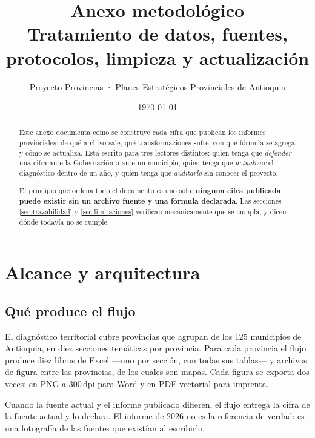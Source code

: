 \documentclass[11pt,a4paper]{article}
\title{\vspace{-1.5cm}\bfseries\color{tintauno}
  Anexo metodológico\\[2mm]
  \large\mdseries\color{tintados}
  Tratamiento de datos, fuentes, protocolos, limpieza y actualización}
\author{\normalsize\color{tintados} Proyecto Provincias · Planes Estratégicos
  Provinciales de Antioquia}
\date{\normalsize\color{tintatres}\today}
\begin{document}
\maketitle
\thispagestyle{fancy}

\begin{abstract}
\noindent
Este anexo documenta cómo se construye cada cifra que publican los informes
provinciales: de qué archivo sale, qué transformaciones sufre, con qué fórmula
se agrega y cómo se actualiza. Está escrito para tres lectores distintos: quien
tenga que \emph{defender} una cifra ante la Gobernación o ante un municipio,
quien tenga que \emph{actualizar} el diagnóstico dentro de un año, y quien tenga
que \emph{auditarlo} sin conocer el proyecto.

El principio que ordena todo el documento es uno solo: \textbf{ninguna cifra
publicada puede existir sin un archivo fuente y una fórmula declarada}. Las
secciones \ref{sec:trazabilidad} y \ref{sec:limitaciones} verifican
mecánicamente que se cumpla, y dicen dónde todavía no se cumple.
\end{abstract}

\tableofcontents
\newpage

\section{Alcance y arquitectura}

\subsection{Qué produce el flujo}

El diagnóstico territorial cubre \cifraProvincias{} provincias que agrupan
\cifraMunicipios{} de los 125 municipios de Antioquia, en diez secciones
temáticas por provincia. Para cada provincia el flujo produce diez libros de
Excel —uno por sección, con todas sus tablas— y \cifraFiguras{} archivos de
figura entre las \cifraProvincias{} provincias, de los cuales \cifraMapas{} son
mapas. Cada figura se exporta dos veces: en PNG a 300\,dpi para Word y en PDF
vectorial para imprenta.

\begin{regla}[title={Regla 0 — el dato manda sobre el informe}]
Cuando la fuente actual y el informe publicado difieren, el flujo entrega la
cifra de la fuente actual y lo declara. El informe de 2026 no es la referencia
de verdad: es una fotografía de las fuentes que existían al escribirlo.
\end{regla}
\end{document}
